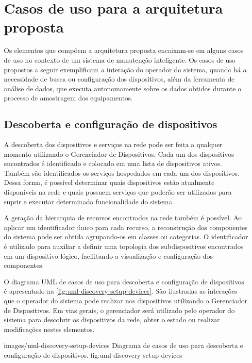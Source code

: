 \section{Casos de uso para a arquitetura proposta}

Os elementos que compõem a arquitetura proposta encaixam-se em alguns casos de uso no contexto de um
sistema de manutenção inteligente. Os casos de uso propostos a seguir exemplificam a interação do
operador do sistema, quando há a necessidade de busca ou configuração dos dispositivos, além da
ferramenta de análise de dados, que executa autonomamente sobre os dados obtidos durante o processo
de amostragem dos equipamentos.


\subsection{Descoberta e configuração de dispositivos}

A descoberta dos dispositivos e serviços na rede pode ser feita a qualquer momento utilizando o
Gerenciador de Dispositivos. Cada um dos dispositivos encontrados é identificado e colocado em uma
lista de dispositivos ativos. Também são identificados os serviços hospedados em cada um dos
dispositivos. Dessa forma, é possível determinar quais dispositivos estão atualmente disponíveis na
rede e quais possuem serviços que poderão ser utilizados para suprir e executar determinada
funcionalidade do sistema.

A geração da hierarquia de recursos encontrados na rede também é possível. Ao aplicar um
identificador único para cada recurso, a reconstrução dos componentes do sistema pode ser obtida
agrupando-os em classes ou categorias. O identificador é utilizado para auxiliar a definir uma
topologia dos subdispositivos encontrados em um dispositivo lógico, facilitando a visualização e
configuração dos componentes.

O diagrama \gls{UML} de casos de uso para descoberta e configuração de dispositivos é apresentado na
\cref{fig:uml-discovery-setup-devices}. São ilustradas as interações que o operador do sistema pode
realizar nos dispositivos utilizando o Gerenciador de Dispositivos. Em vias gerais, o gerenciador
será utilizado pelo operador do sistema para descobrir os dispositivos da rede, obter o estado ou
realizar modificações nestes elementos.

  {images/uml-discovery-setup-devices}
  {Diagrama de casos de uso para descoberta e configuração de dispositivos.}
  {fig:uml-discovery-setup-devices}

